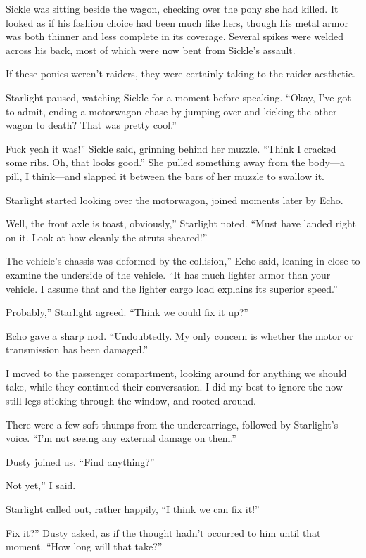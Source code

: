 Sickle was sitting beside the wagon, checking over the pony she had killed. It looked as if his fashion choice had been much like hers, though his metal armor was both thinner and less complete in its coverage. Several spikes were welded across his back, most of which were now bent from Sickle’s assault.

If these ponies weren’t raiders, they were certainly taking to the raider aesthetic.

Starlight paused, watching Sickle for a moment before speaking. “Okay, I’ve got to admit, ending a motorwagon chase by jumping over and kicking the other wagon to death? That was pretty cool.”

\leavevmode{}Fuck yeah it was!” Sickle said, grinning behind her muzzle. “Think I cracked some ribs. Oh, that looks good.” She pulled something away from the body—a pill, I think—and slapped it between the bars of her muzzle to swallow it.

Starlight started looking over the motorwagon, joined moments later by Echo.

\leavevmode{}Well, the front axle is toast, obviously,” Starlight noted. “Must have landed right on it. Look at how cleanly the struts sheared!”

\leavevmode{}The vehicle’s chassis was deformed by the collision,” Echo said, leaning in close to examine the underside of the vehicle. “It has much lighter armor than your vehicle. I assume that and the lighter cargo load explains its superior speed.”

\leavevmode{}Probably,” Starlight agreed. “Think we could fix it up?”

Echo gave a sharp nod. “Undoubtedly. My only concern is whether the motor or transmission has been damaged.”

I moved to the passenger compartment, looking around for anything we should take, while they continued their conversation. I did my best to ignore the now-still legs sticking through the window, and rooted around.

There were a few soft thumps from the undercarriage, followed by Starlight’s voice. “I’m not seeing any external damage on them.”

Dusty joined us. “Find anything?”

\leavevmode{}Not yet,” I said.

Starlight called out, rather happily, “I think we can fix it!”

\leavevmode{}Fix it?” Dusty asked, as if the thought hadn’t occurred to him until that moment. “How long will that take?”


